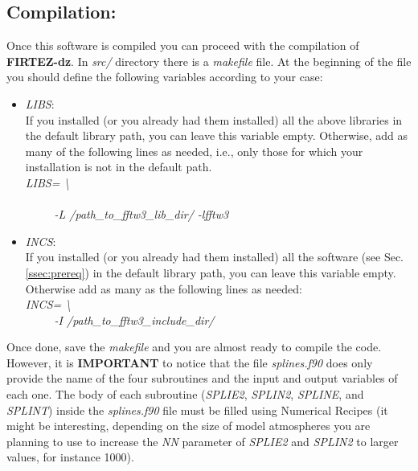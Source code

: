 \subsection{Compilation:}
Once this software is compiled you can proceed with the compilation of {\bf FIRTEZ-dz}. In {\it src/} directory there is a {\it makefile} file. At the beginning of the file you should define the following variables according to your case:\\
\begin{itemize}
  \item {\it LIBS}:\\
  If you installed (or you already had them installed) all the above libraries in the default library path, you can leave this variable empty. Otherwise, add as many of the following lines as needed, i.e., only those for which your installation is not in the default path.\\
  {\it LIBS= \textbackslash}\\
  \hspace{10mm}{\it -L /path\_to\_lapack\_lib\_dir/ -llapack -lblas \textbackslash}\\
  {\it \ \ \ \ \ -L /path\_to\_fftw3\_lib\_dir/ -lfftw3}\\
  \item {\it INCS}:\\
  If you installed (or you already had them installed) all the software (see Sec. \ref{ssec:prereq}) in the default library path, you can leave this variable empty. Otherwise add as many as the following lines as needed:\\
  {\it INCS= \textbackslash}\\
  {\it \ \ \ \ \ -I /path\_to\_fftw3\_include\_dir/}\\
\end{itemize}
%
Once done, save the {\it makefile} and you are almost ready to compile the code.\\

However, it is {\bf IMPORTANT} to notice that the file {\it splines.f90} does only provide the name of the four subroutines and the input and output variables of each one. The body of each subroutine ({\it SPLIE2}, {\it SPLIN2}, {\it SPLINE}, and {\it SPLINT}) inside the {\it splines.f90} file must be filled using Numerical Recipes (it might be interesting, depending on the size of model atmospheres you are planning to use to increase the {\it NN} parameter of {\it SPLIE2} and {\it SPLIN2} to larger values, for instance 1000).\\


